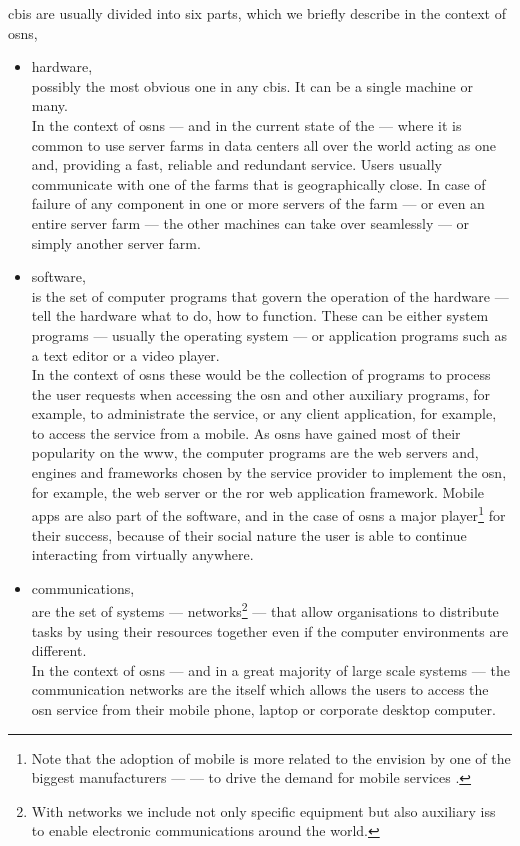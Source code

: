 \documentclass[showtrims, oldfontcommands]{kthesis}
\begin{document}
\Ac{cbis} are usually divided into six parts, which we briefly describe in the context 
of \acp{osn},
\begin{itemize}
    \item hardware,\\
    possibly the most obvious one in any \ac{cbis}. It can be a single machine or 
    many.\\
    In the context of \acp{osn} --- and in the current state of the \Internet 
    --- where it is common to use server farms in data centers all over the world 
    acting as one and, providing a fast, reliable and redundant service. Users usually 
    communicate with one of the farms that is geographically close. In case of failure 
    of any component in one or more servers of the farm --- or even an entire server 
    farm --- the other machines can take over seamlessly --- or simply another server 
    farm.
    
    \item software,\\
    is the set of computer programs that govern the operation of the hardware --- 
    tell the hardware what to do, how to function. These can be either system programs 
    --- usually the operating system --- or application programs such as a text 
    editor or a video player.\\
    In the context of \acp{osn} these would be the collection 
    of programs to process the user requests when accessing the \ac{osn} and other 
    auxiliary programs, for example, to administrate the service, or any client 
    application, for example, to access the service from a mobile. As \acp{osn} 
    have gained most of their popularity on the \ac{www}, the computer programs 
    are the web servers and, engines and frameworks chosen by the service provider 
    to implement the \ac{osn}, for example, the \Apache web server or the \ac{ror} 
    web application framework. Mobile apps are also part of the software, and in 
    the case of \acp{osn} a major player\footnote{Note that the adoption of mobile 
    \Internet is more related to the envision by one of the biggest manufacturers 
    --- \Apple --- to drive the demand for mobile services \cite{WestM10}.} for their 
    success, because of their social nature the user is able to continue interacting 
    from virtually anywhere.
    
    \item communications,\\
    are the set of systems --- networks\footnote{With networks we include not only 
    specific equipment but also auxiliary \acp{is} to enable electronic communications 
    around the world.} --- that allow organisations to distribute tasks by using 
    their resources together even if the computer environments are different.\\
    In the context of \acp{osn} --- and in a great majority of large scale systems --- 
    the communication networks are the \Internet itself which allows the users to 
    access the \ac{osn} service from their mobile phone, laptop or corporate desktop 
    computer.
    

\end{itemize}
\end{document}
